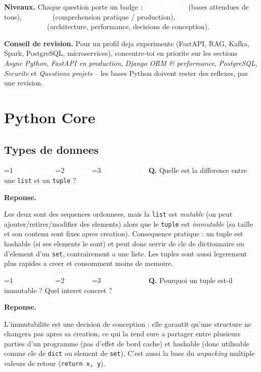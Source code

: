 \documentclass[11pt,a4paper]{article}
\newcommand{\badgeJ}{\textcolor{white}{\colorbox{junior}{\small\bfseries\ JUNIOR\ }}}
\newcommand{\badgeM}{\textcolor{white}{\colorbox{mid}{\small\bfseries\ MID\ }}}
\newcommand{\badgeS}{\textcolor{white}{\colorbox{senior}{\small\bfseries\ SENIOR\ }}}
\newcounter{qcount}
\newenvironment{qa}[2]{%
  \stepcounter{qcount}%
  \par\vspace{6pt}%
  \noindent\colorbox{qbg}{\parbox{\dimexpr\linewidth-12pt}{\vspace{2pt}%
  \ifnum#1=1 \badgeJ\fi\ifnum#1=2 \badgeM\fi\ifnum#1=3 \badgeS\fi
  \ \textbf{Q\theqcount.} #2\vspace{2pt}}}\par\vspace{4pt}%
  \noindent\textbf{\color{accent}Reponse.}\ \ignorespaces
}{%
  \par\vspace{8pt}%
}
\begin{document}
\textbf{Niveaux.} Chaque question porte un badge :
\badgeJ\ (bases attendues de tous), \badgeM\ (comprehension pratique /
production), \badgeS\ (architecture, performance, decisions de conception).

\textbf{Conseil de revision.} Pour un profil deja experimente (FastAPI, RAG,
Kafka, Spark, PostgreSQL, microservices), concentre-toi en priorite sur les
sections \emph{Async Python}, \emph{FastAPI en production}, \emph{Django ORM \&
performance}, \emph{PostgreSQL}, \emph{Securite} et \emph{Questions projets} --
les bases Python doivent rester des reflexes, pas une revision.

\newpage

\section{Python Core}

\subsection{Types de donnees}

\begin{qa}{1}{Quelle est la difference entre une \texttt{list} et un \texttt{tuple} ?}
Les deux sont des sequences ordonnees, mais la \texttt{list} est \emph{mutable}
(on peut ajouter/retirer/modifier des elements) alors que le \texttt{tuple} est
\emph{immutable} (sa taille et son contenu sont fixes apres creation). Consequence
pratique : un tuple est hashable (si ses elements le sont) et peut donc servir
de cle de dictionnaire ou d'element d'un \texttt{set}, contrairement a une liste.
Les tuples sont aussi legerement plus rapides a creer et consomment moins de
memoire.
\end{qa}

\begin{qa}{1}{Pourquoi un tuple est-il immutable ? Quel interet concret ?}
L'immutabilite est une decision de conception : elle garantit qu'une structure
ne changera pas apres sa creation, ce qui la rend sure a partager entre
plusieurs parties d'un programme (pas d'effet de bord cache) et hashable (donc
utilisable comme cle de \texttt{dict} ou element de \texttt{set}). C'est aussi
la base du \emph{unpacking} multiple valeurs de retour (\texttt{return x, y}).
\end{qa}
\end{document}
